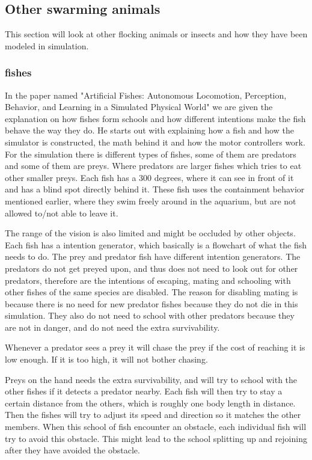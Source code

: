 \subsection{Other swarming animals}
This section will look at other flocking animals or insects and how they have been modeled in simulation.
\subsubsection{fishes}
In the paper named "Artificial Fishes: Autonomous Locomotion, Perception, Behavior, and Learning in a Simulated Physical World" \citep{Demetri1994} we are given the explanation on how fishes form schools and how different intentions make the fish behave the way they do. He starts out with explaining how a fish and how the simulator is constructed, the math behind it and how the motor controllers work. For the simulation there is different types of fishes, some of them are predators and some of them are preys. Where predators are larger fishes which tries to eat other smaller preys. Each fish has a 300 degrees, where it can see in front of it and has a blind spot directly behind it. These fish uses the containment behavior mentioned earlier, where they swim freely around in the aquarium, but are not allowed to/not able to leave it.

The range of the vision is also limited and might be occluded by other objects. Each fish has a intention generator, which basically is a flowchart of what the fish needs to do. The prey and predator fish have different intention generators. The predators do not get preyed upon, and thus does not need to look out for other predators, therefore are the intentions of escaping, mating and schooling with other fishes of the same species are disabled. The reason for disabling mating is because there is no need for new predator fishes because they do not die in this simulation. They also do not need to school with other predators because they are not in danger, and do not need the extra survivability.

Whenever a predator sees a prey it will chase the prey if the cost of reaching it is low enough. If it is too high, it will not bother chasing.

Preys on the hand needs the extra survivability, and will try to school with the other fishes if it detects a predator nearby. Each fish will then try to stay a certain distance from the others, which is roughly one body length in distance. Then the fishes will try to adjust its speed and direction so it matches the other members. When this school of fish encounter an obstacle, each individual fish will try to avoid this obstacle. This might lead to the school splitting up and rejoining after they have avoided the obstacle.

